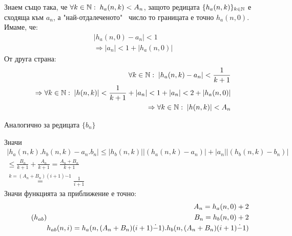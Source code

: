 \begin{solution}
    Знаем също така, че $\forall k \in {\mathbb{N}}:\; h_a(n, k) < A_n$, защото редицата $\{h_a(n, k)\}_{k\in{\mathbb{N}}}$ е сходяща към $a_n$, а "най-отдалеченото" \ число то границата е точно $h_a(n,0)$. Имаме, че:
    \begin{equation}
        \begin{split}
            |h_a(n, 0) - a_n| < 1\\
            \Rightarrow |a_n| < 1 + |h_a(n, 0)|
        \end{split}
    \end{equation}
    От друга страна:
    \begin{equation}
        \begin{split}
            \forall k\in{\mathbb{N}}:\; |h_a(n, k) - a_n| < \frac{1}{k+1}\\
            \Rightarrow \forall k\in{\mathbb{N}}:\; |h(n,k)| < \frac{1}{k+1} + |a_n| < 1 + |a_n| < 2 + |h_a(n, 0)|\\
            \Rightarrow \forall k\in{\mathbb{N}}:\; |h(n,k)| < A_n
        \end{split}
    \end{equation}
    
    Аналогично за редицата $\{b_n\}$

    Значи
    \begin{equation}
        \begin{split}
             \left|h_a(n, k).h_b(n, k) - a_n.b_n\right| \leq \left|h_b(n, k)\right|\left|(h_a(n,k) - a_n) \right| + \left|a_n\right|\left|(h_b(n,k) - b_n)\right| \\
             \leq \frac{B_n}{k+1} + \frac{A_n}{k+1} = \frac{A_n + B_n}{k+1}\\
             \overset{k = (A_n + B_n)(i+1) \dot{-} 1}{=} \frac{1}{i+1}
        \end{split}
    \end{equation}
    Значи функцията за приближение е точно:
    \begin{equation}\tag{$h_{ab}$}
        \begin{split}
            A_n = h_a(n, 0) + 2 \\
            B_n = h_b(n, 0) + 2 \\
            h_{ab}(n, i) = h_a(n, (A_n + B_n)(i+1) \dot{-} 1).h_b(n, (A_n + B_n)(i+1) \dot{-} 1)
        \end{split}
    \end{equation}
\end{solution}